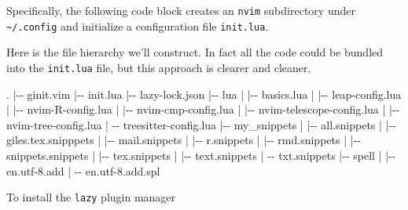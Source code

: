 \documentclass[
  letterpaper,
  DIV=11,
  numbers=noendperiod,
  oneside]{scrartcl}
\newenvironment{Shaded}{\begin{snugshade}}{\end{snugshade}}
\newcommand{\AttributeTok}[1]{\textcolor[rgb]{0.40,0.45,0.13}{#1}}
\newcommand{\BuiltInTok}[1]{\textcolor[rgb]{0.00,0.23,0.31}{#1}}
\newcommand{\ExtensionTok}[1]{\textcolor[rgb]{0.00,0.23,0.31}{#1}}
\newcommand{\KeywordTok}[1]{\textcolor[rgb]{0.00,0.23,0.31}{#1}}
\newcommand{\NormalTok}[1]{\textcolor[rgb]{0.00,0.23,0.31}{#1}}
\begin{document}
Specifically, the following code block creates an \texttt{nvim}
subdirectory under \texttt{\textasciitilde{}/.config} and initialize a
configuration file \texttt{init.lua}.

Here is the file hierarchy we'll construct. In fact all the code could
be bundled into the \texttt{init.lua} file, but this approach is clearer
and cleaner.

\begin{Shaded}
\begin{Highlighting}[]
\BuiltInTok{.}
\KeywordTok{|}\ExtensionTok{{-}{-}}\NormalTok{ ginit.vim}
\KeywordTok{|}\ExtensionTok{{-}{-}}\NormalTok{ init.lua}
\KeywordTok{|}\ExtensionTok{{-}{-}}\NormalTok{ lazy{-}lock.json}
\KeywordTok{|}\ExtensionTok{{-}{-}}\NormalTok{ lua}
\KeywordTok{|}   \KeywordTok{|}\ExtensionTok{{-}{-}}\NormalTok{ basics.lua}
\KeywordTok{|}   \KeywordTok{|}\ExtensionTok{{-}{-}}\NormalTok{ leap{-}config.lua}
\KeywordTok{|}   \KeywordTok{|}\ExtensionTok{{-}{-}}\NormalTok{ nvim{-}R{-}config.lua}
\KeywordTok{|}   \KeywordTok{|}\ExtensionTok{{-}{-}}\NormalTok{ nvim{-}cmp{-}config.lua}
\KeywordTok{|}   \KeywordTok{|}\ExtensionTok{{-}{-}}\NormalTok{ nvim{-}telescope{-}config.lua}
\KeywordTok{|}   \KeywordTok{|}\ExtensionTok{{-}{-}}\NormalTok{ nvim{-}tree{-}config.lua}
\KeywordTok{|}   \KeywordTok{\textasciigrave{}}\ExtensionTok{{-}{-}}\NormalTok{ treesitter{-}config.lua}
\KeywordTok{|}\ExtensionTok{{-}{-}}\NormalTok{ my\_snippets}
\KeywordTok{|}   \KeywordTok{|}\ExtensionTok{{-}{-}}\NormalTok{ all.snippets}
\KeywordTok{|}   \KeywordTok{|}\ExtensionTok{{-}{-}}\NormalTok{ giles.tex.snipppets}
\KeywordTok{|}   \KeywordTok{|}\ExtensionTok{{-}{-}}\NormalTok{ mail.snippets}
\KeywordTok{|}   \KeywordTok{|}\ExtensionTok{{-}{-}}\NormalTok{ r.snippets}
\KeywordTok{|}   \KeywordTok{|}\ExtensionTok{{-}{-}}\NormalTok{ rmd.snippets}
\KeywordTok{|}   \KeywordTok{|}\ExtensionTok{{-}{-}}\NormalTok{ snippets.snippets}
\KeywordTok{|}   \KeywordTok{|}\ExtensionTok{{-}{-}}\NormalTok{ tex.snippets}
\KeywordTok{|}   \KeywordTok{|}\ExtensionTok{{-}{-}}\NormalTok{ text.snippets}
\KeywordTok{|}   \KeywordTok{\textasciigrave{}}\AttributeTok{{-}{-}}\NormalTok{ txt.snippets}
\KeywordTok{|}\ExtensionTok{{-}{-}}\NormalTok{ spell}
\KeywordTok{|}   \KeywordTok{|}\ExtensionTok{{-}{-}}\NormalTok{ en.utf{-}8.add}
\KeywordTok{|}   \KeywordTok{\textasciigrave{}}\ExtensionTok{{-}{-}}\NormalTok{ en.utf{-}8.add.spl}
\end{Highlighting}
\end{Shaded}

To install the \texttt{lazy} plugin manager
\end{document}
